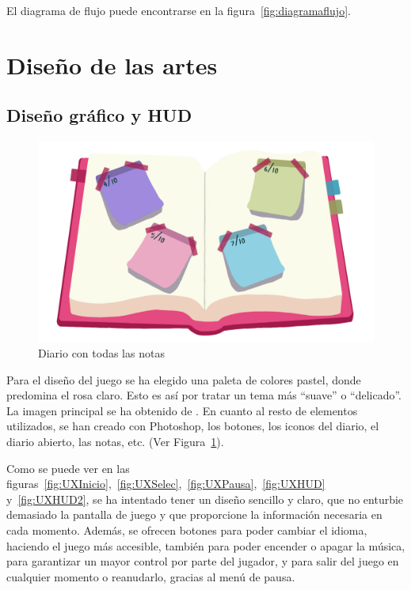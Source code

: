 \documentclass[12pt, a4paper,twoside,titlepage]{book}
\begin{document}
El diagrama de flujo puede encontrarse en la figura~\ref{fig:diagramaflujo}.





\section{Diseño de las artes}
\label{sec:diseñoArtes}
\subsection{Diseño gráfico y HUD}

\begin{figure}
	\centering
	\includegraphics[width=.8\linewidth]{TGF/Artes/diarioNotas.png}
	\caption{Diario con todas las notas}
	\label{fig:diarioNotas}
\end{figure}

Para el diseño del juego se ha elegido una paleta de colores pastel, donde predomina el rosa claro. Esto es así por tratar un tema más ``suave'' o ``delicado''. La imagen principal se ha obtenido de \cite{imgInicio}. En cuanto al resto de elementos utilizados, se han creado con Photoshop, los botones, los iconos del diario, el diario abierto, las notas, etc. (Ver Figura~\ref{fig:diarioNotas}). 

Como se puede ver en las figuras~\ref{fig:UXInicio},~\ref{fig:UXSelec},~\ref{fig:UXPausa},~\ref{fig:UXHUD} y~\ref{fig:UXHUD2}, se ha intentado tener un diseño sencillo y claro, que no enturbie demasiado la pantalla de juego y que proporcione la información necesaria en cada momento. Además, se ofrecen botones para poder cambiar el idioma, haciendo el juego más accesible, también para poder encender o apagar la música, para garantizar un mayor control por parte del jugador, y para salir del juego en cualquier momento o reanudarlo, gracias al menú de pausa. 
\end{document}
